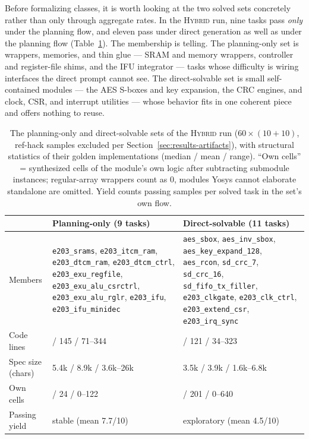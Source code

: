 Before formalizing classes, it is worth looking at the two solved sets
concretely rather than only through aggregate rates. In the
\textsc{Hybrid} run, nine tasks pass \emph{only} under the planning flow,
and eleven pass under direct generation as well as under the planning flow
(Table~\ref{tab:flow-sets}). The membership is telling. The
planning-only set is wrappers, memories, and thin glue --- SRAM and
memory wrappers, controller and register-file shims, and the IFU
integrator --- tasks whose difficulty is wiring interfaces the direct
prompt cannot see. The direct-solvable set is small self-contained
modules --- the AES S-boxes and key expansion, the CRC engines, and
clock, CSR, and interrupt utilities --- whose behavior fits in one
coherent piece and offers nothing to reuse.

\begin{table}[htbp]
  \centering
  \caption[Planning-only vs.\ direct-solvable sets]{The planning-only
    and direct-solvable sets of the \textsc{Hybrid} run
    ($60\times(10{+}10)$, ref-hack samples excluded per
    Section~\ref{sec:results-artifacts}), with structural statistics of
    their golden implementations (median / mean / range). ``Own cells''
    = synthesized cells of the module's own logic after subtracting
    submodule instances; regular-array wrappers count as 0, modules
    Yosys cannot elaborate standalone are omitted. Yield counts passing
    samples per solved task in the set's own flow.}
  \label{tab:flow-sets}
  \small
  \setlength{\tabcolsep}{5pt}
  \begin{tabular}{@{}l
      >{\raggedright\arraybackslash}p{}
      >{\raggedright\arraybackslash}p{}@{}}
    \toprule
     & Planning-only (9 tasks) & Direct-solvable (11 tasks) \\
    \midrule
    Members &
      \texttt{e203\_srams}, \texttt{e203\_itcm\_ram},
      \texttt{e203\_dtcm\_ram}, \texttt{e203\_dtcm\_ctrl},
      \texttt{e203\_exu\_regfile}, \texttt{e203\_exu\_alu\_csrctrl},
      \texttt{e203\_exu\_alu\_rglr}, \texttt{e203\_ifu},
      \texttt{e203\_ifu\_minidec} &
      \texttt{aes\_sbox}, \texttt{aes\_inv\_sbox},
      \texttt{aes\_key\_expand\_128}, \texttt{aes\_rcon},
      \texttt{sd\_crc\_7}, \texttt{sd\_crc\_16},
      \texttt{sd\_fifo\_tx\_filler}, \texttt{e203\_clkgate},
      \texttt{e203\_clk\_ctrl}, \texttt{e203\_extend\_csr},
      \texttt{e203\_irq\_sync} \\
    \midrule
    Code lines        & 114 / 145 / 71--344        & 93 / 121 / 34--323 \\
    Spec size (chars) & 5.4k / 8.9k / 3.6k--26k    & 3.5k / 3.9k / 1.6k--6.8k \\
    Own cells         & 0 / 24 / 0--122            & 20 / 201 / 0--640 \\
    Passing yield     & stable (mean 7.7/10)        & exploratory (mean 4.5/10) \\
    \bottomrule
  \end{tabular}
\end{table}

